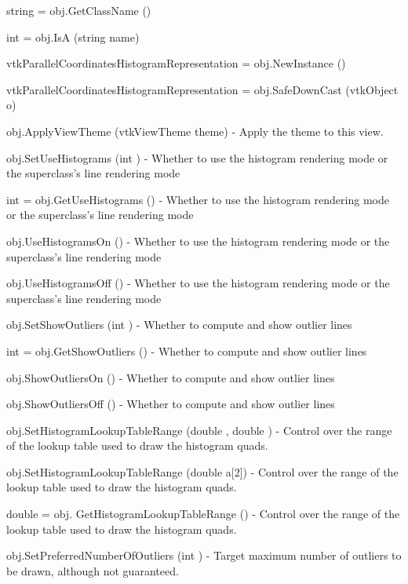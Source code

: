 \begin{DoxyItemize}
\item {\ttfamily string = obj.\-Get\-Class\-Name ()}  
\item {\ttfamily int = obj.\-Is\-A (string name)}  
\item {\ttfamily vtk\-Parallel\-Coordinates\-Histogram\-Representation = obj.\-New\-Instance ()}  
\item {\ttfamily vtk\-Parallel\-Coordinates\-Histogram\-Representation = obj.\-Safe\-Down\-Cast (vtk\-Object o)}  
\item {\ttfamily obj.\-Apply\-View\-Theme (vtk\-View\-Theme theme)} -\/ Apply the theme to this view.  
\item {\ttfamily obj.\-Set\-Use\-Histograms (int )} -\/ Whether to use the histogram rendering mode or the superclass's line rendering mode  
\item {\ttfamily int = obj.\-Get\-Use\-Histograms ()} -\/ Whether to use the histogram rendering mode or the superclass's line rendering mode  
\item {\ttfamily obj.\-Use\-Histograms\-On ()} -\/ Whether to use the histogram rendering mode or the superclass's line rendering mode  
\item {\ttfamily obj.\-Use\-Histograms\-Off ()} -\/ Whether to use the histogram rendering mode or the superclass's line rendering mode  
\item {\ttfamily obj.\-Set\-Show\-Outliers (int )} -\/ Whether to compute and show outlier lines  
\item {\ttfamily int = obj.\-Get\-Show\-Outliers ()} -\/ Whether to compute and show outlier lines  
\item {\ttfamily obj.\-Show\-Outliers\-On ()} -\/ Whether to compute and show outlier lines  
\item {\ttfamily obj.\-Show\-Outliers\-Off ()} -\/ Whether to compute and show outlier lines  
\item {\ttfamily obj.\-Set\-Histogram\-Lookup\-Table\-Range (double , double )} -\/ Control over the range of the lookup table used to draw the histogram quads.  
\item {\ttfamily obj.\-Set\-Histogram\-Lookup\-Table\-Range (double a\mbox{[}2\mbox{]})} -\/ Control over the range of the lookup table used to draw the histogram quads.  
\item {\ttfamily double = obj. Get\-Histogram\-Lookup\-Table\-Range ()} -\/ Control over the range of the lookup table used to draw the histogram quads.  
\item {\ttfamily obj.\-Set\-Preferred\-Number\-Of\-Outliers (int )} -\/ Target maximum number of outliers to be drawn, although not guaranteed.  

\end{DoxyItemize}
